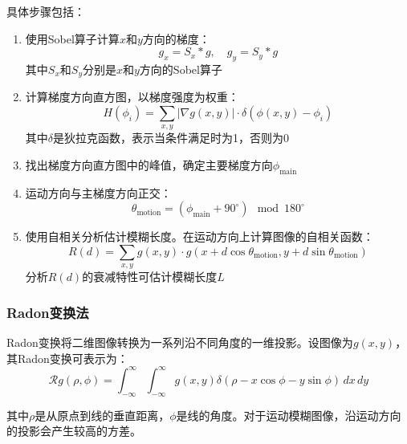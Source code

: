 \documentclass[a4paper,11pt,UTF8]{ctexart}
\begin{document}
具体步骤包括：
\begin{enumerate}
    \item 使用Sobel算子计算$x$和$y$方向的梯度：
    \begin{equation}
    g_x = S_x * g, \quad g_y = S_y * g
    \end{equation}
    其中$S_x$和$S_y$分别是$x$和$y$方向的Sobel算子
    \item 计算梯度方向直方图，以梯度强度为权重：
    \begin{equation}
    H(\phi_i) = \sum_{x,y} |\nabla g(x,y)| \cdot \delta(\phi(x,y) - \phi_i)
    \end{equation}
    其中$\delta$是狄拉克函数，表示当条件满足时为1，否则为0
    \item 找出梯度方向直方图中的峰值，确定主要梯度方向$\phi_{\text{main}}$
    \item 运动方向与主梯度方向正交：
    \begin{equation}
    \theta_{\text{motion}} = (\phi_{\text{main}} + 90^\circ) \mod 180^\circ
    \end{equation}
    \item 使用自相关分析估计模糊长度。在运动方向上计算图像的自相关函数：
    \begin{equation}
    R(d) = \sum_{x,y} g(x,y) \cdot g(x+d\cos\theta_{\text{motion}}, y+d\sin\theta_{\text{motion}})
    \end{equation}
    分析$R(d)$的衰减特性可估计模糊长度$L$
\end{enumerate}

\subsubsection{Radon变换法}
Radon变换将二维图像转换为一系列沿不同角度的一维投影。设图像为$g(x,y)$，其Radon变换可表示为：
\begin{equation}
\mathcal{R}g(\rho, \phi) = \int_{-\infty}^{\infty}\int_{-\infty}^{\infty} g(x,y) \delta(\rho - x\cos\phi - y\sin\phi) \, dx \, dy
\end{equation}

其中$\rho$是从原点到线的垂直距离，$\phi$是线的角度。对于运动模糊图像，沿运动方向的投影会产生较高的方差。
\end{document}
